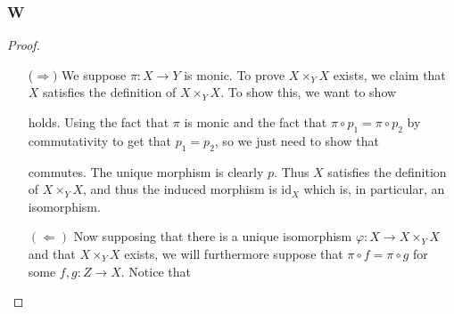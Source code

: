 \documentclass{article}
\newcommand{\id}{\mathrm{id}}
\begin{document}
\subsubsection{W}\label{1.3.W}
\begin{proof}
    \begin{enumerate}
        \item[($\Rightarrow)$]
        We suppose $\pi:X\to Y$ is monic. To prove $X\times_YX$ exists, we claim that $X$ satisfies the definition of $X\times_Y X$. To show this, we want to show
        \begin{center}
    \end{center}
    holds. Using the fact that $\pi$ is monic and the fact that $\pi\circ p_1=\pi\circ p_2$ by commutativity to get that $p_1=p_2$, so we just need to show that
    \begin{center}
    \end{center}
    commutes. The unique morphism is clearly $p$. Thus $X$ satisfies the definition of $X\times_Y X$, and thus the induced morphism is $\id_X$ which is, in particular, an isomorphism.
    \item[$(\Leftarrow)$]
    Now supposing that there is a unique isomorphism $\varphi:X\to X\times_YX$ and that $X\times_Y X$ exists, we will furthermore suppose that $\pi\circ f=\pi\circ g$ for some $f,g:Z\to X$. Notice that 
    \begin{center}
\end{center}
\end{enumerate}
\end{proof}
\end{document}
